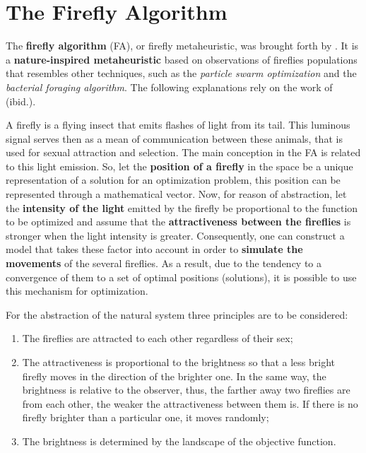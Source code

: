 \documentclass[tuberlin,cic,tc,openright,english,noabntcite,oneside]{iiufrgs}
\begin{document}
\section{The Firefly Algorithm}
The \textbf{firefly algorithm} (FA), or firefly metaheuristic, was brought forth by \textcite{yang_firefly_2009}. It is a \textbf{nature-inspired metaheuristic} based on observations of fireflies populations that resembles other techniques, such as the \emph{particle swarm optimization} and the \emph{bacterial foraging algorithm}. The following explanations rely on the work of (ibid.).

A firefly is a flying insect that emits flashes of light from its tail. This luminous signal serves then as a mean of communication between these animals, that is used for sexual attraction and selection. The main conception in the FA is related to this light emission. So, let the \textbf{position of a firefly} in the space be a unique representation of a solution for an optimization problem, this position can be represented through a mathematical vector. Now, for reason of abstraction, let the \textbf{intensity of the light} emitted by the firefly be proportional to the function to be optimized and assume that the \textbf{attractiveness between the fireflies} is stronger when the light intensity is greater. Consequently, one can construct a model that takes these factor into account in order to \textbf{simulate the movements} of the several fireflies. As a result, due to the tendency to a convergence of them to a set of optimal positions (solutions), it is possible to use this mechanism for optimization.

For the abstraction of the natural system three principles are to be considered:
\begin{enumerate}
	\item The fireflies are attracted to each other regardless of their sex;
	\item The attractiveness is proportional to the brightness so that a less bright firefly moves in the direction of the brighter one. In the same way, the brightness is relative to the observer, thus, the farther away two fireflies are from each other, the weaker the attractiveness between them is. If there is no firefly brighter than a particular one, it moves randomly;
	\item The brightness is determined by the landscape of the objective function.
\end{enumerate}
\end{document}
